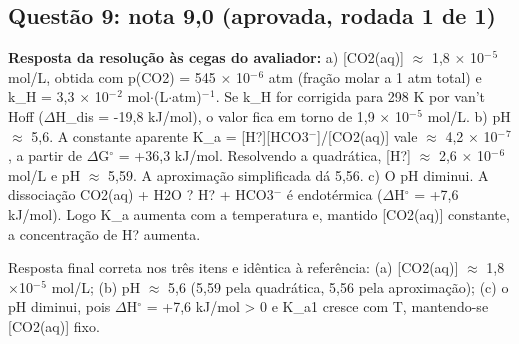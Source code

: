 \documentclass{article}%
\begin{document}
\subsection*{Questão 9: nota 9,0 (aprovada, rodada 1 de 1)}%
\textbf{Resposta da resolução às cegas do avaliador:} a) {[}CO2(aq){]} $\approx$ 1,8 $\times$ 10$^{-}$$^{5}$ mol/L, obtida com p(CO2) = 545 $\times$ 10$^{-}$$^{6}$ atm (fração molar a 1 atm total) e k\_H = 3,3 $\times$ 10$^{-}$$^2$ mol$\cdot$(L$\cdot$atm)$^{-}$$^{1}$. Se k\_H for corrigida para 298 K por van't Hoff ($\Delta$H\_dis = -19,8 kJ/mol), o valor fica em torno de 1,9 $\times$ 10$^{-}$$^{5}$ mol/L.\newline%
\newline%
b) pH $\approx$ 5,6. A constante aparente K\_a = {[}H?{]}{[}HCO3$^{-}${]}/{[}CO2(aq){]} vale $\approx$ 4,2 $\times$ 10$^{-}$$^{7}$, a partir de $\Delta$G$^\circ$ = +36,3 kJ/mol. Resolvendo a quadrática, {[}H?{]} $\approx$ 2,6 $\times$ 10$^{-}$$^{6}$ mol/L e pH $\approx$ 5,59. A aproximação simplificada dá 5,56.\newline%
\newline%
c) O pH diminui. A dissociação CO2(aq) + H2O ? H? + HCO3$^{-}$ é endotérmica ($\Delta$H$^\circ$ = +7,6 kJ/mol). Logo K\_a aumenta com a temperatura e, mantido {[}CO2(aq){]} constante, a concentração de H? aumenta.\par %
Resposta final correta nos três itens e idêntica à referência: (a) {[}CO2(aq){]} $\approx$ 1,8$\times$10$^{-}$$^{5}$ mol/L; (b) pH $\approx$ 5,6 (5,59 pela quadrática, 5,56 pela aproximação); (c) o pH diminui, pois $\Delta$H$^\circ$ = +7,6 kJ/mol > 0 e K\_a1 cresce com T, mantendo{-}se {[}CO2(aq){]} fixo.\newline%
\newline%
\end{document}
